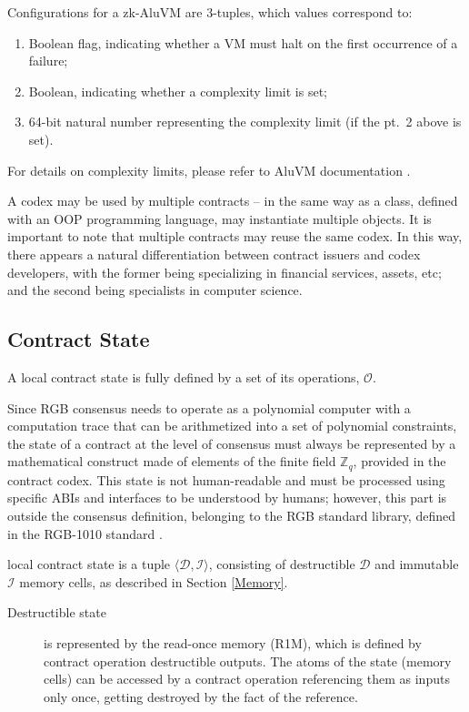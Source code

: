 \documentclass[9pt,oneside]{amsart}
\begin{document}
\begin{multicols}{2}


Configurations for a zk-AluVM are 3-tuples, which values correspond to:
\begin{enumerate}
\item Boolean flag, indicating whether a VM must halt on the first occurrence of a failure;
\item Boolean, indicating whether a complexity limit is set;
\item 64-bit natural number representing the complexity limit (if the pt.~2 above is set).
\end{enumerate}

For details on complexity limits, please refer to AluVM documentation \cite{AluVM}.

A codex may be used by multiple contracts – in the same way as a class,
defined with an OOP programming language, may instantiate multiple objects.
It is important to note that multiple contracts may reuse the same codex.
In this way, there appears a natural differentiation between contract issuers and codex developers,
with the former being specializing in financial services, assets, etc;
and the second being specialists in computer science.


\subsection{Contract State}

A \gls{local contract state} is fully defined by a set of its operations, $\mathcal{O}$.

Since RGB consensus needs to operate as a polynomial computer
with a computation trace that can be arithmetized into a set of polynomial constraints,
the state of a contract at the level of consensus must always be represented
by a mathematical construct made of elements of the finite field $\mathbb{Z}_q$,
provided in the contract codex.
This state is not human-readable and must be processed using specific ABIs and interfaces
to be understood by humans; however, this part is outside the consensus definition,
belonging to the RGB standard library, defined in the RGB-1010 standard \cite{RGB1010}.

\Gls{local contract state} is a tuple $\langle \mathcal{D}, \mathcal{I} \rangle$,
consisting of destructible $\mathcal{D}$ and immutable $\mathcal{I}$ memory cells,
as described in Section \ref{Memory}.

\begin{description}
\item[Destructible state] is represented by the \gls{read-once memory} (R1M),
  which is defined by contract operation destructible outputs.
  The atoms of the state (memory cells) can be accessed by a contract operation
  referencing them as inputs only once, getting destroyed by the fact of the reference.


\end{description}
\end{multicols}
\end{document}
